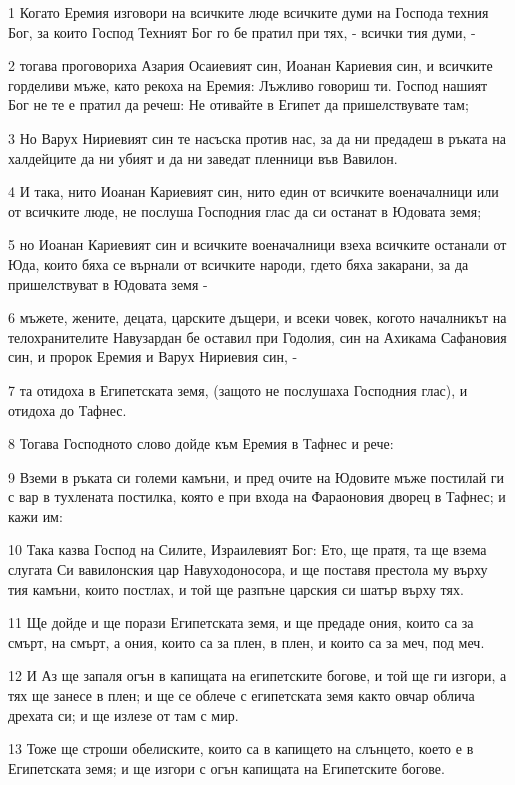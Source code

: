 \par 1 Когато Еремия изговори на всичките люде всичките думи на Господа техния Бог, за които Господ Техният Бог го бе пратил при тях, - всички тия думи, -
\par 2 тогава проговориха Азария Осаиевият син, Иоанан Кариевия син, и всичките горделиви мъже, като рекоха на Еремия: Лъжливо говориш ти. Господ нашият Бог не те е пратил да речеш: Не отивайте в Египет да пришелствувате там;
\par 3 Но Варух Нириевият син те насъска против нас, за да ни предадеш в ръката на халдейците да ни убият и да ни заведат пленници във Вавилон.
\par 4 И така, нито Иоанан Кариевият син, нито един от всичките военачалници или от всичките люде, не послуша Господния глас да си останат в Юдовата земя;
\par 5 но Иоанан Кариевият син и всичките военачалници взеха всичките останали от Юда, които бяха се върнали от всичките народи, гдето бяха закарани, за да пришелствуват в Юдовата земя -
\par 6 мъжете, жените, децата, царските дъщери, и всеки човек, когото началникът на телохранителите Навузардан бе оставил при Годолия, син на Ахикама Сафановия син, и пророк Еремия и Варух Нириевия син, -
\par 7 та отидоха в Египетската земя, (защото не послушаха Господния глас), и отидоха до Тафнес.
\par 8 Тогава Господното слово дойде към Еремия в Тафнес и рече:
\par 9 Вземи в ръката си големи камъни, и пред очите на Юдовите мъже постилай ги с вар в тухлената постилка, която е при входа на Фараоновия дворец в Тафнес; и кажи им:
\par 10 Така казва Господ на Силите, Израилевият Бог: Ето, ще пратя, та ще взема слугата Си вавилонския цар Навуходоносора, и ще поставя престола му върху тия камъни, които постлах, и той ще разпъне царския си шатър върху тях.
\par 11 Ще дойде и ще порази Египетската земя, и ще предаде ония, които са за смърт, на смърт, а ония, които са за плен, в плен, и които са за меч, под меч.
\par 12 И Аз ще запаля огън в капищата на египетските богове, и той ще ги изгори, а тях ще занесе в плен; и ще се облече с египетската земя както овчар облича дрехата си; и ще излезе от там с мир.
\par 13 Тоже ще строши обелиските, които са в капището на слънцето, което е в Египетската земя; и ще изгори с огън капищата на Египетските богове.

